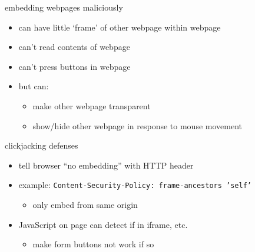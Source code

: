 
\begin{frame}{embedding webpages maliciously}
    \begin{itemize}
    \item can have little `frame' of other webpage within webpage
    \item can't read contents of webpage
    \item can't press buttons in webpage
    \vspace{.5cm}
    \item but can:
        \begin{itemize}
        \item make other webpage transparent
        \item show/hide other webpage in response to mouse movement
        \end{itemize}
    \end{itemize}
\end{frame}

\begin{frame}{clickjacking defenses}
    \begin{itemize}
    \item tell browser ``no embedding'' with HTTP header
    \item example: \texttt{\small Content-Security-Policy: frame-ancestors 'self'}
        \begin{itemize}
        \item only embed from same origin
        \end{itemize}
        \vspace{.5cm}
    \item JavaScript on page can detect if in iframe, etc.
        \begin{itemize}
        \item make form buttons not work if so
        \end{itemize}
    \end{itemize}
\end{frame}


